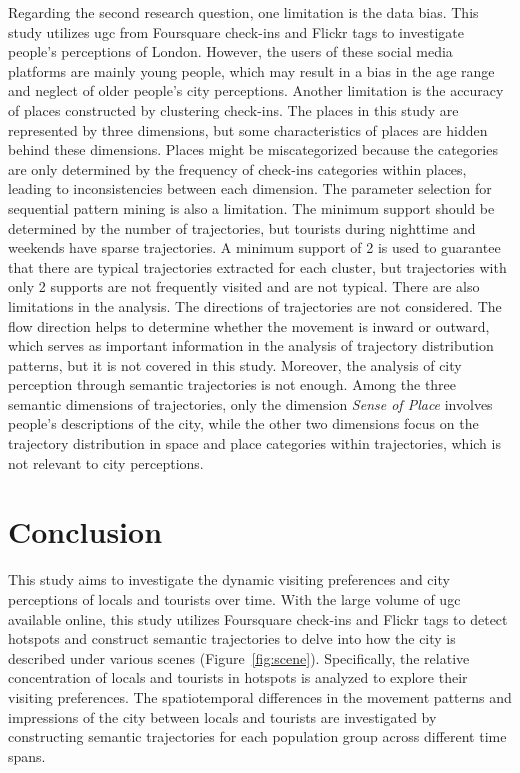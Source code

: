 \documentclass{article}
\theoremstyle{remark}
\begin{document}
Regarding the second research question, one limitation is the data bias. This study utilizes \acrshort{ugc} from Foursquare check-ins and Flickr tags to investigate people's perceptions of London. However, the users of these social media platforms are mainly young people, which may result in a bias in the age range and neglect of older people's city perceptions. Another limitation is the accuracy of places constructed by clustering check-ins. The places in this study are represented by three dimensions, but some characteristics of places are hidden behind these dimensions. Places might be miscategorized because the categories are only determined by the frequency of check-ins categories within places, leading to inconsistencies between each dimension. The parameter selection for sequential pattern mining is also a limitation. The minimum support should be determined by the number of trajectories, but tourists during nighttime and weekends have sparse trajectories. A minimum support of 2 is used to guarantee that there are typical trajectories extracted for each cluster, but trajectories with only 2 supports are not frequently visited and are not typical. There are also limitations in the analysis. The directions of trajectories are not considered. The flow direction helps to determine whether the movement is inward or outward, which serves as important information in the analysis of trajectory distribution patterns, but it is not covered in this study. Moreover, the analysis of city perception through semantic trajectories is not enough. Among the three semantic dimensions of trajectories, only the dimension \textit{Sense of Place} involves people's descriptions of the city, while the other two dimensions focus on the trajectory distribution in space and place categories within trajectories, which is not relevant to city perceptions.


\clearpage


\section{Conclusion}

This study aims to investigate the dynamic visiting preferences and city perceptions of locals and tourists over time. With the large volume of \acrshort{ugc} available online, this study utilizes Foursquare check-ins and Flickr tags to detect hotspots and construct semantic trajectories to delve into how the city is described under various scenes (Figure~\ref{fig:scene}). Specifically, the relative concentration of locals and tourists in hotspots is analyzed to explore their visiting preferences. The spatiotemporal differences in the movement patterns and impressions of the city between locals and tourists are investigated by constructing semantic trajectories for each population group across different time spans.
\end{document}
